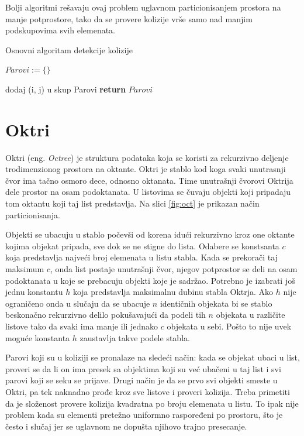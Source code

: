 \documentclass[12pt,oneside]{memoir}
\begin{document}
Bolji algoritmi rešavaju ovaj problem uglavnom particionisanjem prostora na manje potprostore, tako da
se provere kolizije vrše samo nad manjim podskupovima svih elemenata.

\begin{algorithm}
	\caption{Osnovni algoritam detekcije kolizije}
    \label{alg:triv}
	\begin{algorithmic}[1]
		\State $Parovi := \{ \}$

				\State dodaj (i, j) u skup Parovi
			\EndIf		
		\EndFor
		\EndFor
		\State \textbf{return} $Parovi$
		\EndProcedure
    \end{algorithmic}
\end{algorithm}

\section{Oktri}
\label{subsec:octree}

Oktri (eng. {\em Octree}) je struktura podataka koja se koristi za rekurzivno deljenje trodimenzionog
prostora na oktante. Oktri je stablo kod koga svaki unutrasnji čvor ima tačno osmoro dece, odnosno oktanata. 
Time unutrašnji čvorovi Oktrija dele prostor na osam podoktanata.
U listovima se čuvaju objekti koji pripadaju tom oktantu koji taj list predstavlja.
Na slici \ref{fig:oct} je prikazan način particionisanja.

Objekti se ubacuju u stablo počevši od korena idući rekurzivno kroz one oktante kojima objekat pripada,
sve dok se ne stigne do lista.
Odabere se konstsanta $c$ koja predstavlja najveći broj elemenata u listu stabla. 
Kada se prekorači taj maksimum $c$, onda list postaje unutrašnji čvor, njegov potprostor se deli 
na osam podoktanata u koje se prebacuju objekti koje je sadržao.
Potrebno je izabrati još jednu konstantu $h$ koja predstavlja maksimalnu dubinu stabla Oktrja.
Ako $h$ nije ograničeno onda u slučaju da se ubacuje $n$ identičnih objekata bi se stablo 
beskonačno rekurzivno delilo pokušavajući da podeli tih $n$ objekata u različite listove 
tako da svaki ima manje ili jednako $c$ objekata u sebi. 
Pošto to nije uvek moguće konstanta $h$ zaustavlja takve podele stabla.

Parovi koji su u koliziji se pronalaze na sledeći način:
kada se objekat ubaci u list, proveri se da li on ima presek sa objektima koji su već
ubačeni u taj list i svi parovi koji se seku se prijave.
Drugi način je da se prvo svi objekti smeste u Oktri, pa tek naknadno prođe kroz sve listove 
i proveri kolizija. 
Treba primetiti da je složenost provere kolizija kvadratna po broju elemenata u listu.
To ipak nije problem kada su elementi pretežno uniformno raspoređeni po prostoru, što je često 
i slučaj jer se uglavnom ne dopušta njihovo trajno presecanje. 
\end{document}
